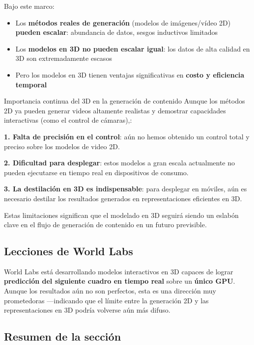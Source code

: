 \documentclass[a4paper]{article}
\begin{document}
Bajo este marco:
\begin{itemize}
    \item Los \textbf{métodos reales de generación} (modelos de imágenes/vídeo 2D) \textbf{pueden escalar}: abundancia de datos, sesgos inductivos limitados
    \item Los \textbf{modelos en 3D no pueden escalar igual}: los datos de alta calidad en 3D son extremadamente escasos
    \item Pero los modelos en 3D tienen ventajas significativas en \textbf{costo y eficiencia temporal}
\end{itemize}

\begin{importantbox}{Importancia continua del 3D en la generación de contenido}
Aunque los métodos 2D ya pueden generar videos altamente realistas y demostrar capacidades interactivas (como el control de cámaras),:

\textbf{1. Falta de precisión en el control}: aún no hemos obtenido un control total y preciso sobre los modelos de video 2D.

\textbf{2. Dificultad para desplegar}: estos modelos a gran escala actualmente no pueden ejecutarse en tiempo real en dispositivos de consumo.

\textbf{3. La destilación en 3D es indispensable}: para desplegar en móviles, aún es necesario destilar los resultados generados en representaciones eficientes en 3D.

Estas limitaciones significan que el modelado en 3D seguirá siendo un eslabón clave en el flujo de generación de contenido en un futuro previsible.
\end{importantbox}

\subsection{Lecciones de World Labs}

World Labs está desarrollando modelos interactivos en 3D capaces de lograr \textbf{predicción del siguiente cuadro en tiempo real} sobre un \textbf{único GPU}. Aunque los resultados aún no son perfectos, esta es una dirección muy prometedoras —indicando que el límite entre la generación 2D y las representaciones en 3D podría volverse aún más difuso.

\subsection{Resumen de la sección}
\end{document}
